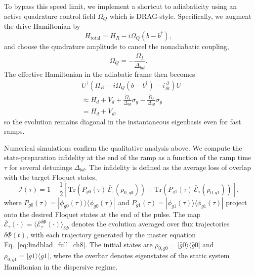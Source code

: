To bypass this speed limit, we implement a shortcut to adiabaticity using an active quadrature control field $\Omega_Q$ which is DRAG-style.
Specifically, we augment the drive Hamiltonian by
\begin{equation}
H_{\text{total}} = H_R - i \Omega_Q (b - b^\dagger),
\end{equation}
and choose the quadrature amplitude to cancel the nonadiabatic coupling,
\begin{equation}
\Omega_Q = -\frac{\dot{\Omega}_I}{\Delta_{bd}}.
\end{equation}
The effective Hamiltonian in the adiabatic frame then becomes
\begin{equation}
\begin{aligned}
&U^\dagger \left( H_R - i \Omega_Q (b - b^\dagger) - i \frac{\partial}{\partial t} \right) U\\
&\approx H_d + V_d + \frac{\dot{\Omega}_I}{\Delta_{bd}} \sigma_y - \frac{\dot{\Omega}_I}{\Delta_{bd}} \sigma_y \\
&= H_d + V_d,
\end{aligned}
\end{equation}
so the evolution remains diagonal in the instantaneous eigenbasis even for fast ramps.

Numerical simulations confirm the qualitative analysis above. We compute the state-preparation infidelity at the end of the ramp as a function of the ramp time $\tau$ for several detunings $\Delta_{bd}$.
The infidelity is defined as the average loss of overlap with the target Floquet states,
\begin{equation}
\label{eq:infidelity_def_ch7}
\mathcal{I}(\tau)
=
1-\frac{1}{2}\left[
\mathrm{Tr}\!\left(P_{g0}(\tau)\,\bar{\mathcal{E}}_{\tau}\!\left(\rho_{0,g0}\right)\right)
+
\mathrm{Tr}\!\left(P_{g1}(\tau)\,\bar{\mathcal{E}}_{\tau}\!\left(\rho_{0,g1}\right)\right)
\right].
\end{equation}
where $P_{g0}(\tau)=|\phi_{g0}(\tau)\rangle\langle\phi_{g0}(\tau)|$ and
$P_{g1}(\tau)=|\phi_{g1}(\tau)\rangle\langle\phi_{g1}(\tau)|$ project onto the desired Floquet states at the end of the pulse. The map
$\bar{\mathcal{E}}_{\tau}(\cdot)=\langle \mathcal{E}_{\tau}^{\delta\Phi}(\cdot)\rangle_{\delta\Phi}$
denotes the evolution averaged over flux trajectories $\delta\Phi(t)$, with each trajectory generated by the master equation Eq.\ \eqref{eq:lindblad_full_ch8}.
The initial states are
$\rho_{0,g0}=|\bar g0\rangle\langle\bar g0|$ and
$\rho_{0,g1}=|\bar g1\rangle\langle\bar g1|$, where the overbar denotes eigenstates of the static system Hamiltonian in the dispersive regime.

